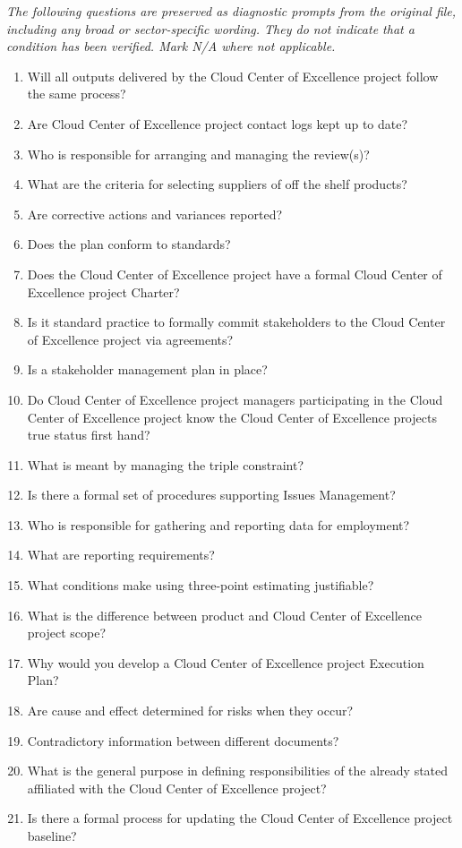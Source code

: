 \documentclass[10pt,letterpaper]{article}
\newcommand{\docsection}[1]{\par\Needspace{5\baselineskip}\vspace{8pt}{\large\sffamily\bfseries\color{navy}#1}\par\vspace{2pt}{\color{rulegrey}\rule{\linewidth}{.6pt}}\par}
\begin{document}
\docsection{03 \quad Source diagnostic checklist}
\textit{The following questions are preserved as diagnostic prompts from the original file, including any broad or sector-specific wording. They do not indicate that a condition has been verified. Mark N/A where not applicable.}
\begingroup\small\begin{enumerate}[leftmargin=2.1em, itemsep=4pt]
\item[1.] Will all outputs delivered by the Cloud Center of Excellence project follow the same process?
\item[2.] Are Cloud Center of Excellence project contact logs kept up to date?
\item[3.] Who is responsible for arranging and managing the review(s)?
\item[4.] What are the criteria for selecting suppliers of off the shelf products?
\item[5.] Are corrective actions and variances reported?
\item[6.] Does the plan conform to standards?
\item[7.] Does the Cloud Center of Excellence project have a formal Cloud Center of Excellence project Charter?
\item[8.] Is it standard practice to formally commit stakeholders to the Cloud Center of Excellence project via agreements?
\item[9.] Is a stakeholder management plan in place?
\item[10.] Do Cloud Center of Excellence project managers participating in the Cloud Center of Excellence project know the Cloud Center of Excellence projects true status first hand?
\item[11.] What is meant by managing the triple constraint?
\item[12.] Is there a formal set of procedures supporting Issues Management?
\item[13.] Who is responsible for gathering and reporting data for employment?
\item[14.] What are reporting requirements?
\item[15.] What conditions make using three-point estimating justifiable?
\item[16.] What is the difference between product and Cloud Center of Excellence project scope?
\item[17.] Why would you develop a Cloud Center of Excellence project Execution Plan?
\item[18.] Are cause and effect determined for risks when they occur?
\item[19.] Contradictory information between different documents?
\item[20.] What is the general purpose in defining responsibilities of the already stated affiliated with the Cloud Center of Excellence project?
\item[21.] Is there a formal process for updating the Cloud Center of Excellence project baseline?
\end{enumerate}\endgroup
\end{document}
